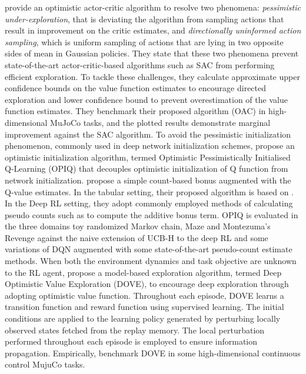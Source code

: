  provide an optimistic actor-critic algorithm to resolve two phenomena: \textit{pessimistic under-exploration}, that is deviating the algorithm from sampling actions that result in improvement on the critic estimates, and \textit{directionally uninformed action sampling}, which is uniform sampling of actions that are lying in two opposite sides of mean in Gaussian policies. They state that these two phenomena prevent state-of-the-art actor-critic-based algorithms such as SAC  from performing efficient exploration. To tackle these challenges, they calculate approximate upper confidence bounds on the value function estimates to encourage directed exploration and lower confidence bound to prevent overestimation of the value function estimates. They benchmark their proposed algorithm (OAC) in high-dimensional MuJoCo tasks, and the plotted results demonstrate marginal improvement against the SAC algorithm.
To avoid the pessimistic initialization phenomenon, commonly used in deep network initialization schemes,  propose an optimistic initialization algorithm, termed Optimistic Pessimistically Initialised Q-Learning (OPIQ) that decouples optimistic initialization of Q function from network initialization.  propose a simple count-based bonus augmented with the Q-value estimates. In the tabular setting, their proposed algorithm is based on . In the Deep RL setting, they adopt commonly employed methods of calculating pseudo counts such as  to compute the additive bonus term. OPIQ is evaluated in the three domains toy randomized Markov chain, Maze and Montezuma's Revenge against the naive extension of UCB-H  to the deep RL and some variations of DQN augmented with some state-of-the-art pseudo-count estimate methods.
When both the environment dynamics and task objective are unknown to the RL agent,  propose a model-based exploration algorithm, termed Deep Optimistic Value Exploration (DOVE), to encourage deep exploration through adopting optimistic value function. Throughout each episode, DOVE learns a transition function and reward function using supervised learning. The initial conditions are applied to the learning policy generated by perturbing locally observed states fetched from the replay memory. The local perturbation performed throughout each episode is employed to ensure information propagation. Empirically,  benchmark DOVE in some high-dimensional continuous control MujuCo tasks.

